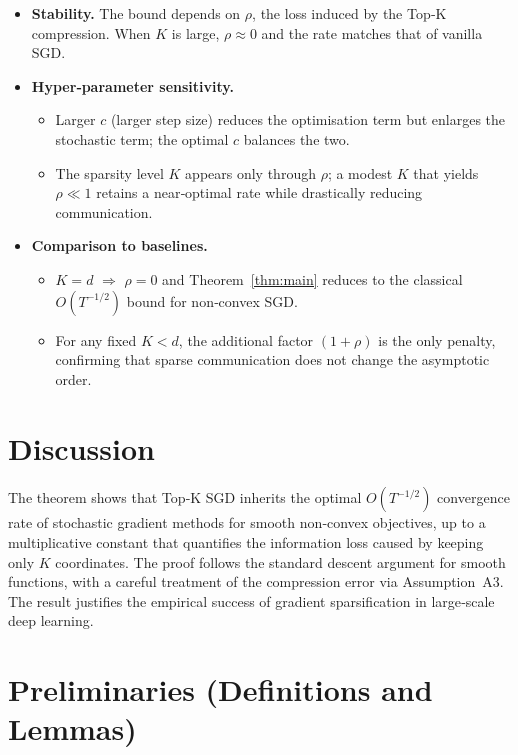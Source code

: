 \documentclass{article}
\begin{document}
\begin{itemize}
  \item \textbf{Stability.} The bound depends on $\rho$, the loss induced by the
  Top‑K compression.  When $K$ is large, $\rho\approx0$ and the rate matches
  that of vanilla SGD.
  \item \textbf{Hyper‑parameter sensitivity.}
  \begin{itemize}
    \item Larger $c$ (larger step size) reduces the optimisation term but
    enlarges the stochastic term; the optimal $c$ balances the two.
    \item The sparsity level $K$ appears only through $\rho$; a modest $K$ that
    yields $\rho\ll1$ retains a near‑optimal rate while drastically reducing
    communication.
  \end{itemize}
  \item \textbf{Comparison to baselines.}
  \begin{itemize}
    \item $K=d$ $\Rightarrow$ $\rho=0$ and Theorem~\ref{thm:main} reduces to the
    classical $O(T^{-1/2})$ bound for non‑convex SGD.
    \item For any fixed $K<d$, the additional factor $(1+\rho)$ is the only
    penalty, confirming that sparse communication does not change the asymptotic
    order.
  \end{itemize}
\end{itemize}

\section*{Discussion}

The theorem shows that Top‑K SGD inherits the optimal
$O(T^{-1/2})$ convergence rate of stochastic gradient methods for smooth
non‑convex objectives, up to a multiplicative constant that quantifies the
information loss caused by keeping only $K$ coordinates.  The proof follows the
standard descent argument for smooth functions, with a careful treatment of
the compression error via Assumption~A3.  The result justifies the empirical
success of gradient sparsification in large‑scale deep learning.

\section*{Preliminaries (Definitions and Lemmas)}
\end{document}
